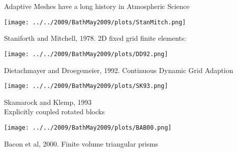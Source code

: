\begin{slide}{Adaptive Meshes have a long history in Atmospheric Science}

\vspace{10pt}
\begin{minipage}{0.49\linewidth}\begin{minipage}{0.66\linewidth}
    \texttt{[image: ../../2009/BathMay2009/plots/StanMitch.png]}
\end{minipage}\begin{minipage}{0.33\linewidth}\raggedright
    Staniforth and Mitchell, 1978. 2D fixed grid finite elements:
\end{minipage}\end{minipage}
%
\begin{minipage}{0.49\linewidth}\begin{minipage}{0.66\linewidth}
    \texttt{[image: ../../2009/BathMay2009/plots/DD92.png]}
\end{minipage}\begin{minipage}{0.33\linewidth}\raggedright
    Dietachmayer and Droegemeier, 1992.
    Continuous Dynamic Grid Adaption \\
\end{minipage}\end{minipage}

\vspace{10pt}

\begin{minipage}{0.49\linewidth}\begin{minipage}{0.66\linewidth}
    \texttt{[image: ../../2009/BathMay2009/plots/SK93.png]}
\end{minipage}\begin{minipage}{0.33\linewidth}\raggedright
    Skamarock and Klemp, 1993 \\
    Explicitly coupled rotated blocks
\end{minipage}\end{minipage}
%
\begin{minipage}{0.49\linewidth}\begin{minipage}{0.66\linewidth}
    \texttt{[image: ../../2009/BathMay2009/plots/BAB00.png]}
\end{minipage}\begin{minipage}{0.33\linewidth}\raggedright
    Bacon et al, 2000. Finite volume triangular prisms
\end{minipage}\end{minipage}

\end{slide}

